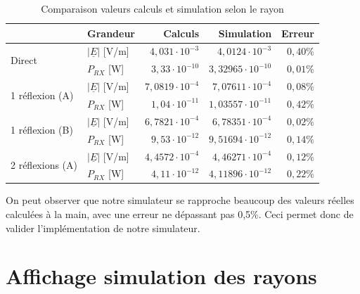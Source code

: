 \begin{table}[H]
    \centering
    \begin{tabular}{|l|l|r|r|r|}
         \hline
                                  & Grandeur & Calculs & Simulation & Erreur \\
        \hline
\multirow{2}{*}{Direct}           & $\left|\underline{E}\right|$ [V/m] & $4,031\cdot10^{-3}$ & $4,0124\cdot10^{-3}$ & $0,40\%$ \\
                                  & $P_{RX}$ [W] & $3,33\cdot10^{-10}$  & $3,32965\cdot10^{-10}$ & $0,01\%$     \\
        \hline
\multirow{2}{*}{1 réflexion (A)}  & $\left|\underline{E}\right|$ [V/m] & $7,0819\cdot10^{-4}$ & $7,07611\cdot10^{-4}$ & $0,08\%$ \\
                                  & $P_{RX}$ [W] & $1,04\cdot10^{-11}$ & $1,03557\cdot10^{-11}$ & $0,42\%$ \\
        \hline
\multirow{2}{*}{1 réflexion (B)}  & $\left|\underline{E}\right|$ [V/m] & $6,7821\cdot10^{-4}$ & $6,78351\cdot10^{-4}$ & $0,02\%$ \\
                                  & $P_{RX}$ [W] & $9,53\cdot10^{-12}$ & $9,51694\cdot10^{-12}$ & $0,14\%$ \\
        \hline
\multirow{2}{*}{2 réflexions (A)} & $\left|\underline{E}\right|$ [V/m] & $4,4572\cdot10^{-4}$ & $4,46271\cdot10^{-4}$ & $0,12\%$ \\
                                  & $P_{RX}$ [W] & $4,11\cdot10^{-12}$ & $4,11896\cdot10^{-12}$ & $0,22\%$ \\
        \hline
    \end{tabular}
    \caption{Comparaison valeurs calculs et simulation selon le rayon}
    \label{tab:comparaison-calculs-simulation}
\end{table}

On peut observer que notre simulateur se rapproche beaucoup des valeurs réelles calculées à la main, avec une erreur ne dépassant pas 0,5\%. Ceci permet donc de valider l'implémentation de notre simulateur.

\section{Affichage simulation des rayons}

